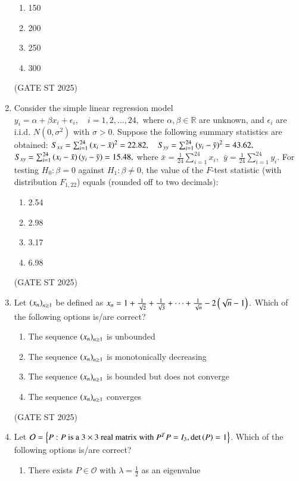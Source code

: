 \documentclass[journal,12pt,onecolumn]{IEEEtran}
\theoremstyle{remark}
\begin{document}
\begin{enumerate}
\begin{enumerate}
\item 150
\item 200
\item 250
\item 300
\end{enumerate}
\hfill{(GATE ST 2025)}
\item Consider the simple linear regression model
$
y_i = \alpha + \beta x_i + \epsilon_i, \quad i=1,2,\dots,24,
$
where $\alpha,\beta \in \mathbb{R}$ are unknown, and $\epsilon_i$ are i.i.d. $N(0,\sigma^2)$ with $\sigma>0$. Suppose the following summary statistics are obtained:
$
S_{xx} = \sum_{i=1}^{24}\left(x_i-\bar{x}\right)^2 = 22.82, \quad 
S_{yy} = \sum_{i=1}^{24}\left(y_i-\bar{y}\right)^2 = 43.62,
$
$
S_{xy} = \sum_{i=1}^{24}\left(x_i-\bar{x}\right)\left(y_i-\bar{y}\right) = 15.48,
$
where $\bar{x}=\tfrac{1}{24}\sum_{i=1}^{24} x_i$, $\;\bar{y}=\tfrac{1}{24}\sum_{i=1}^{24} y_i$.  
For testing $H_0:\beta=0$ against $H_1:\beta \neq 0$, the value of the $F$-test statistic (with distribution $F_{1,22}$) equals (rounded off to two decimals):
\begin{enumerate}
\item 2.54
\item 2.98
\item 3.17
\item 6.98
\end{enumerate}
\hfill{(GATE ST 2025)}
\item Let $\left(x_n\right)_{n\geq 1}$ be defined as
$
x_n = 1 + \frac{1}{\sqrt{2}} + \frac{1}{\sqrt{3}} + \cdots + \frac{1}{\sqrt{n}} - 2\left(\sqrt{n}-1\right).
$
Which of the following options is/are correct?
\begin{enumerate}
\item The sequence $\left(x_n\right)_{n\geq 1}$ is unbounded
\item The sequence $\left(x_n\right)_{n\geq 1}$ is monotonically decreasing
\item The sequence $\left(x_n\right)_{n\geq 1}$ is bounded but does not converge
\item The sequence $\left(x_n\right)_{n\geq 1}$ converges
\end{enumerate}
\hfill{(GATE ST 2025)}
\item Let $\mathcal{O} = \left\{P: P \text{ is a } 3\times 3 \text{ real matrix with } P^TP=I_3, \det\left(P\right)=1\right\}$.  
Which of the following options is/are correct?
\begin{enumerate}
\item There exists $P \in \mathcal{O}$ with $\lambda=\tfrac{1}{2}$ as an eigenvalue

\end{enumerate}
\end{enumerate}
\end{document}
